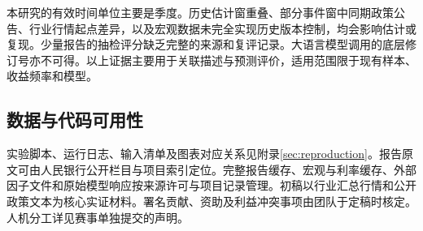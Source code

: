 本研究的有效时间单位主要是季度。历史估计窗重叠、部分事件窗中同期政策公告、行业行情起点差异，以及宏观数据未完全实现历史版本控制，均会影响估计或复现。少量报告的抽检评分缺乏完整的来源和复评记录。大语言模型调用的底层修订号亦不可得。以上证据主要用于关联描述与预测评价，适用范围限于现有样本、收益频率和模型。

\subsection{数据与代码可用性}
实验脚本、运行日志、输入清单及图表对应关系见附录\ref{sec:reproduction}。报告原文可由人民银行公开栏目与项目索引定位。完整报告缓存、宏观与利率缓存、外部因子文件和原始模型响应按来源许可与项目记录管理。初稿以行业汇总行情和公开政策文本为核心实证材料。署名贡献、资助及利益冲突事项由团队于定稿时核定。人机分工详见赛事单独提交的声明。
